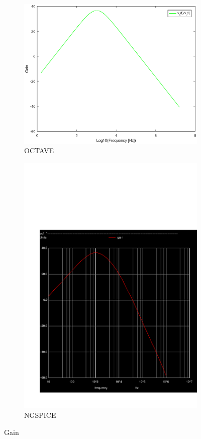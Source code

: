 
\begin{figure}[H] 
\centering
\begin{subfigure}{0.4\textwidth}
\includegraphics[width=\textwidth]{gain.eps}
\caption{OCTAVE}
\label{Octave_gain}
\end{subfigure}
\begin{subfigure}{0.3\textwidth}
\includegraphics[width=\textwidth]{Gain.pdf}
\caption{NGSPICE}
\label{Ngspice_gain}
\end{subfigure}
\caption{Gain}
\end{figure}

